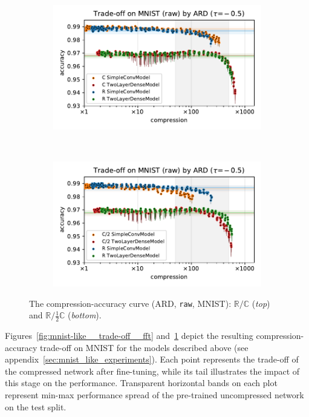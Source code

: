 \documentclass[a4paper,10pt,twocolumn]{article}
\newcommand{\real}{\mathbb{R}}
\newcommand{\cplx}{\mathbb{C}}
\begin{document}
\begin{figure}[!t]
  \centering
  \begin{subfigure}[b]{1.\columnwidth}  %
    \centering
    \includegraphics[width=\columnwidth]{figure__mnist-like__trade-off/appendix__ARD__mnist__raw__-0.5.pdf}
  \end{subfigure} \\%
  \begin{subfigure}[b]{1.\columnwidth}  %
    \centering
    \includegraphics[width=\columnwidth]{figure__mnist-like__trade-off/appendix__cmp__ARD__mnist__raw__-0.5.pdf}
  \end{subfigure}
  \caption{%
    The compression-accuracy curve (ARD, \texttt{raw}, MNIST):
    $\real / \cplx$ (\textit{top}) and $\real / \tfrac12 \cplx$ (\textit{bottom}).
  }
  \label{fig:mnist-like__trade-off__raw}
\end{figure}

Figures~\ref{fig:mnist-like__trade-off__fft} and~\ref{fig:mnist-like__trade-off__raw}
depict the resulting compression-accuracy trade-off on MNIST for the models described
above (see appendix~\ref{sec:mnist_like_experiments}).
%
Each point represents the trade-off of the compressed network after fine-tuning, while
its tail illustrates the impact of this stage on the performance. Transparent horizontal
bands on each plot represent min-max performance spread of the pre-trained uncompressed
network on the test split.
\end{document}
